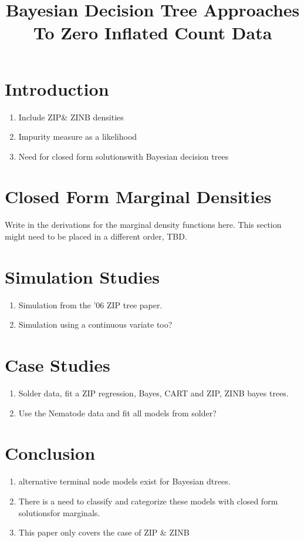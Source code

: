 \documentclass{article}
\newcommand{\CFS}{closed form solutions}
\begin{document}
\title{Bayesian Decision Tree Approaches To Zero Inflated Count Data}
\maketitle

\section{Introduction}

\begin{enumerate}
\item Include ZIP\& ZINB densities 
\item Impurity measure as a likelihood 
\item Need for \CFS with Bayesian decision trees
\end{enumerate}

\section{Closed Form Marginal Densities}

Write in the derivations for the marginal density functions 
here. This section might need to be placed in a different order, TBD. 
\section{Simulation Studies}

\begin{enumerate}
\item Simulation from the '06 ZIP tree paper. 
\item Simulation using a continuous variate too? 
\end{enumerate}

\section{Case Studies}

\begin{enumerate}
\item Solder data, fit a ZIP regression, Bayes, CART and ZIP, ZINB bayes trees.
\item Use the Nematode data and fit all models from solder? 
\end{enumerate}

\section{Conclusion}

\begin{enumerate}
\item alternative terminal node models exist for Bayesian dtrees. 
\item There is a need to classify and categorize these models with \CFS for marginals. 
\item This paper only covers the case of ZIP \& ZINB
\end{enumerate}
\end{document}
